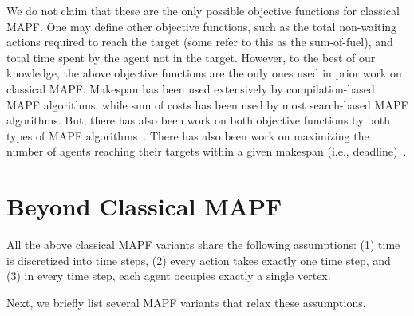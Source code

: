 \documentclass[letterpaper]{article} %
\newcommand{\comment}[1]{{\nb{\textbf{Comment:}}{orange}{#1}}}
\begin{document}
We do not claim that these are the only possible objective functions for classical MAPF.
One may define other objective functions, such as the total non-waiting actions required to reach the target (some refer to this as the sum-of-fuel), and total time spent by the agent not in the target.
However, to the best of our knowledge, the above objective functions are the only ones used in prior work on classical MAPF. Makespan has been used extensively by compilation-based MAPF algorithms, while sum of costs has been used by most search-based MAPF algorithms. But, there has also been work on both objective functions by both types of MAPF algorithms~\cite{surynek2016empirical}. There has also been work on maximizing the number of agents reaching their targets within a given makespan (i.e., deadline)~\cite{MaIJCAI18}.


\section{Beyond Classical MAPF}
All the above classical MAPF variants share the following assumptions: (1) time is discretized into time steps, (2) every action takes exactly one time step,
and (3) in every time step, each agent occupies exactly a single vertex.

Next, we briefly list several MAPF variants that relax these assumptions.
\end{document}
